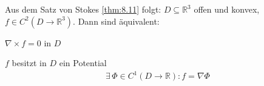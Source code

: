 \begin{notice*}
  Aus dem Satz von Stokes \ref{thm:8.11} folgt: $D \subseteq \mathbb{R}^3$ offen und konvex, $f \in C^2(D \to \mathbb{R}^3)$. Dann sind äquivalent:
  \begin{enum-roman}
    \item $\nabla \times f = 0$ in $D$
    
    \item $f$ besitzt in $D$ ein Potential
    \begin{align*}
      \exists \, \Phi \in C^1(D \to \mathbb{R}) : f = \nabla \Phi
    \end{align*}
  \end{enum-roman}
\end{notice*}
